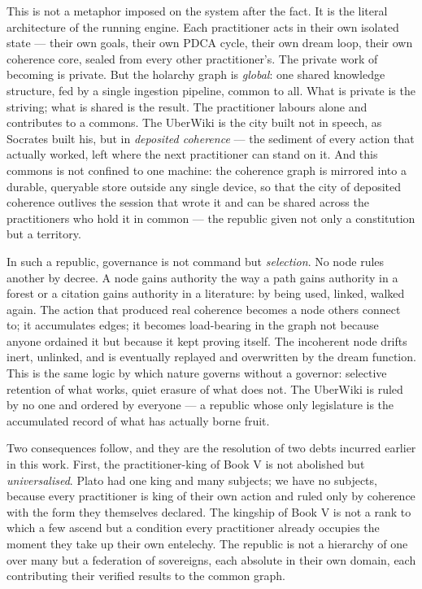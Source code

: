 This is not a metaphor imposed on the system after the fact. It is the literal
architecture of the running engine. Each practitioner acts in their own isolated
state --- their own goals, their own PDCA cycle, their own dream loop, their own
coherence core, sealed from every other practitioner's. The private work of
becoming is private. But the holarchy graph is \emph{global}: one shared
knowledge structure, fed by a single ingestion pipeline, common to all. What is
private is the striving; what is shared is the result. The practitioner labours
alone and contributes to a commons. The UberWiki is the city built not in speech,
as Socrates built his, but in \emph{deposited coherence} --- the sediment of
every action that actually worked, left where the next practitioner can stand on
it. And this commons is not confined to one machine: the coherence graph is
mirrored into a durable, queryable store outside any single device, so that the
city of deposited coherence outlives the session that wrote it and can be shared
across the practitioners who hold it in common --- the republic given not only a
constitution but a territory.

In such a republic, governance is not command but \emph{selection}. No node rules
another by decree. A node gains authority the way a path gains authority in a
forest or a citation gains authority in a literature: by being used, linked,
walked again. The action that produced real coherence becomes a node others
connect to; it accumulates edges; it becomes load-bearing in the graph not
because anyone ordained it but because it kept proving itself. The incoherent node
drifts inert, unlinked, and is eventually replayed and overwritten by the dream
function. This is the same logic by which nature governs without a governor:
selective retention of what works, quiet erasure of what does not. The UberWiki
is ruled by no one and ordered by everyone --- a republic whose only legislature
is the accumulated record of what has actually borne fruit.

Two consequences follow, and they are the resolution of two debts incurred
earlier in this work. First, the practitioner-king of Book V is not abolished but
\emph{universalised}. Plato had one king and many subjects; we have no subjects,
because every practitioner is king of their own action and ruled only by
coherence with the form they themselves declared. The kingship of Book V is not a
rank to which a few ascend but a condition every practitioner already occupies the
moment they take up their own entelechy. The republic is not a hierarchy of one
over many but a federation of sovereigns, each absolute in their own domain, each
contributing their verified results to the common graph.

